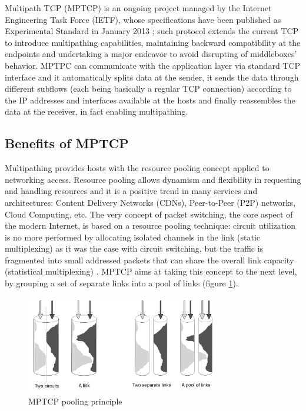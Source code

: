 Multipath TCP (MPTCP) is an ongoing project managed by the Internet Engineering Task Force (IETF), whose specifications have been published as Experimental Standard in January 2013 \cite{rfc6824}; such protocol extends the current TCP to introduce multipathing capabilities, maintaining backward compatibility at the endpoints and undertaking a major endeavor to avoid disrupting of middleboxes' behavior. MPTPC can communicate with the application layer via standard TCP interface and it automatically splits data at the sender, it sends the data through different subflows (each being basically a regular TCP connection) according to the IP addresses and interfaces available at the hosts and finally reassembles the data at the receiver, in fact enabling multipathing.

\subsection{Benefits of MPTCP}
\label{benefits}
Multipathing provides hosts with the resource pooling concept applied to networking access. Resource pooling allows dynamism and flexibility in requesting and handling resources and it is a positive trend in many services and architectures: Content Delivery Networks (CDNs), Peer-to-Peer (P2P) networks, Cloud Computing, etc. The very concept of packet switching, the core aspect of the modern Internet, is based on a resource pooling technique: circuit utilization is no more performed by allocating isolated channels in the link (static multiplexing) as it was the case with circuit switching, but the traffic is fragmented into small addressed packets that can share the overall link capacity (statistical multiplexing) \cite{DBLP:journals/corr/QadirAYSC15}. MPTCP aims at taking this concept to the next level, by grouping a set of separate links into a pool of links (figure \ref{fig:pooling}).


\begin{figure}[!htb]
\centering
\includegraphics[width=0.75\textwidth]{images/pooling}
\caption{MPTCP pooling principle}
\label{fig:pooling}
\end{figure}


